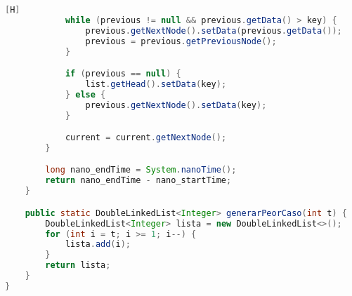\begin{enumerate}[{Ejercicio} 1.]
\begin{lstlisting}[language=java, caption={Test}][H]
            while (previous != null && previous.getData() > key) {
                previous.getNextNode().setData(previous.getData());
                previous = previous.getPreviousNode();
            }

            if (previous == null) {
                list.getHead().setData(key);
            } else {
                previous.getNextNode().setData(key);
            }

            current = current.getNextNode();
        }

        long nano_endTime = System.nanoTime();
        return nano_endTime - nano_startTime;
    }

    public static DoubleLinkedList<Integer> generarPeorCaso(int t) {
        DoubleLinkedList<Integer> lista = new DoubleLinkedList<>();
        for (int i = t; i >= 1; i--) {
            lista.add(i);
        }
        return lista;
    }
}

	\end{lstlisting}
	
\end{enumerate}